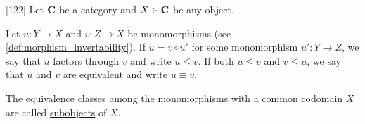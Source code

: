 \begin{definition}\label{def:categorical_subject}\cite{MacLane1994}[122]
  Let $\operatorname{\mathbf{C}}$ be a category and $X \in \operatorname{\mathbf{C}}$ be any object.

  Let $u: Y \to X$ and $v: Z \to X$ be monomorphisms (see \cref{def:morphism_invertability}). If $u = v \circ u'$ for some monomorphism $u': Y \to Z$, we say that \uline{$u$ factors through $v$} and write $u \leq v$. If both $u \leq v$ and $v \leq u$, we say that $u$ and $v$ are equivalent and write $u \equiv v$.

  The equivalence classes among the monomorphisms with a common codomain $X$ are called \uline{subobjects} of $X$.
\end{definition}
